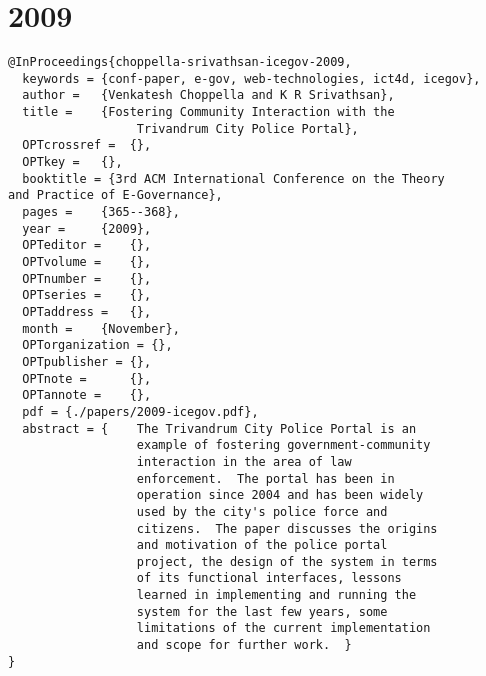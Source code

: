 \documentclass[11pt]{article}
\begin{document}
\section{2009}
\label{sec:org933702a}
\lstset{language=bibtex,label= ,caption= ,captionpos=b,numbers=none}
\begin{lstlisting}
@InProceedings{choppella-srivathsan-icegov-2009,
  keywords = {conf-paper, e-gov, web-technologies, ict4d, icegov},
  author = 	 {Venkatesh Choppella and K R Srivathsan},
  title = 	 {Fostering Community Interaction with the
                  Trivandrum City Police Portal},
  OPTcrossref =  {},
  OPTkey = 	 {},
  booktitle = {3rd ACM International Conference on the Theory
and Practice of E-Governance},
  pages = 	 {365--368},
  year = 	 {2009},
  OPTeditor = 	 {},
  OPTvolume = 	 {},
  OPTnumber = 	 {},
  OPTseries = 	 {},
  OPTaddress = 	 {},
  month = 	 {November},
  OPTorganization = {},
  OPTpublisher = {},
  OPTnote = 	 {},
  OPTannote = 	 {},
  pdf = {./papers/2009-icegov.pdf},
  abstract = {    The Trivandrum City Police Portal is an
                  example of fostering government-community
                  interaction in the area of law
                  enforcement.  The portal has been in
                  operation since 2004 and has been widely
                  used by the city's police force and
                  citizens.  The paper discusses the origins
                  and motivation of the police portal
                  project, the design of the system in terms
                  of its functional interfaces, lessons
                  learned in implementing and running the
                  system for the last few years, some
                  limitations of the current implementation
                  and scope for further work.  }
}


\end{lstlisting}
\end{document}
